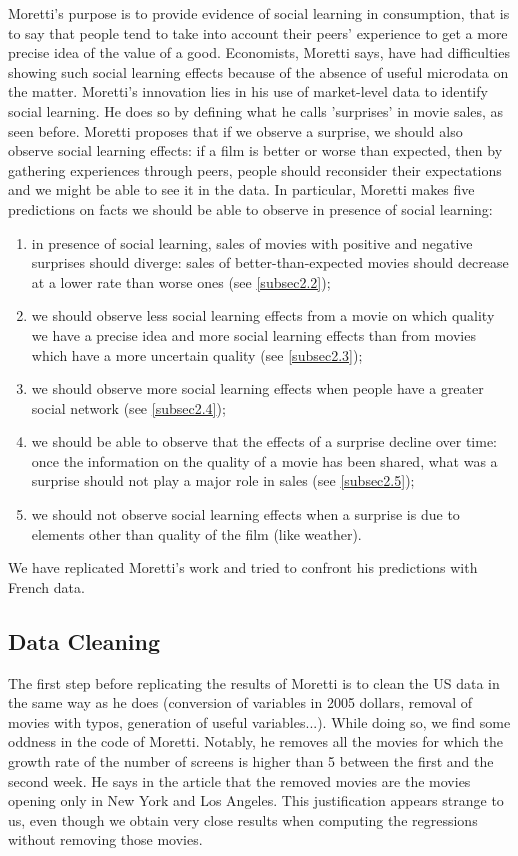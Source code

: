 Moretti's purpose is to provide evidence of social learning in consumption, that is to say that people tend to take into account their peers' experience to get a more precise idea of the value of a good. Economists, Moretti says, have had difficulties showing such social learning effects because of the absence of useful microdata on the matter. Moretti's innovation lies in his use of market-level data to identify social learning. He does so by defining what he calls 'surprises' in movie sales, as seen before. Moretti proposes that if we observe a surprise, we should also observe social learning effects: if a film is better or worse than expected, then by gathering experiences through peers, people should reconsider their expectations and we might be able to see it in the data. In particular, Moretti makes five predictions on facts we should be able to observe in presence of social learning: \begin{enumerate}
	\item in presence of social learning, sales of movies with positive and negative surprises should diverge: sales of better-than-expected movies should decrease at a lower rate than worse ones (see \ref{subsec2.2}); 
	\item we should observe less social learning effects from a movie on which quality we have a precise idea and more social learning effects than from movies which have a more uncertain quality (see \ref{subsec2.3});
	\item we should observe more social learning effects when people have a greater social network (see \ref{subsec2.4});
	\item we should be able to observe that the effects of a surprise decline over time: once the information on the quality of a movie has been shared, what was a surprise should not play a major role in sales (see \ref{subsec2.5});
	\item we should not observe social learning effects when a surprise is due to elements other than quality of the film (like weather).
\end{enumerate}
We have replicated Moretti's work and tried to confront his predictions with French data.

\subsection{Data Cleaning}

The first step before replicating the results of Moretti is to clean the US data in the same way as he does (conversion of variables in 2005 dollars, removal of movies with typos, generation of useful variables...).
While doing so, we find some oddness in the code of Moretti.
Notably, he removes all the movies for which the growth rate of the number of screens is higher than 5 between the first and the second week.
He says in the article that the removed movies are the movies opening only in New York and Los Angeles.
This justification appears strange to us, even though we obtain very close results when computing the regressions without removing those movies.

